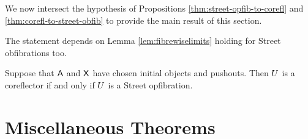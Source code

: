 \documentclass{amsart}
\begin{document}
We now intersect the hypothesis of Propositions
\ref{thm:street-opfib-to-corefl} and
\ref{thm:corefl-to-street-obfib} to provide the
main result of this section.

{\daniel The statement depends on Lemma
  \ref{lem:fibrewiselimits} holding for Street
  obfibrations too.}

\begin{thm}
  \label{thm:main-theorem-street-version}
  Suppose that $ \mathsf{A} $ and $ \mathsf{X} $ have chosen
  initial objects and pushouts. Then $ U $ is a
  coreflector if and only if $ U $ is a Street
  opfibration.  
\end{thm}

\section{Miscellaneous Theorems}



\end{document}
